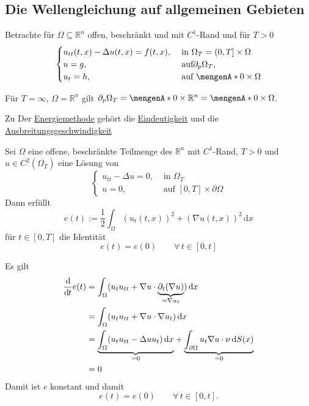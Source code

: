 \subsection{Die Wellengleichung auf allgemeinen Gebieten} 
\label{sub:die_wellengleichung_auf_allgemeinen_gebieten}
Betrachte für $\Omega \subseteq \mathbb{R}^n$ offen, beschränkt und mit $C^1$-Rand und für $T >0$
\[
	\begin{cases}
		u_{tt}(t,x) - \Delta u(t,x) = f(t,x), &\text{ in }\Omega_T = (0,T] \times \Omega\\
		u=g ,&\text{ auf} \partial_p \Omega_T, \\
		u_t=h, &\text{ auf } \set{0} \times \Omega		
	\end{cases}
\]
\begin{bemerkung}
	Für $T= \infty$, $ \Omega = \mathbb{R}^n$ gilt $ \partial _p \Omega_T = \set{0} \times \mathbb{R}^n = \set{0} \times \Omega$.
\end{bemerkung}
Zu Der \underline{Energiemethode} gehört die \underline{Eindeutigkeit} und die \underline{Ausbreitungsgeschwindigkeit} 

\begin{lemma}
	Sei $\Omega$ eine offene, beschränkte Teilmenge des $\mathbb{R}^n$ mit $C^1$-Rand, $T>0$ und $u \in C^2(\overline{\Omega_T})$ eine Lösung von
	\[
		\begin{cases}
			u_{tt}- \Delta u = 0, &\text{ in }\Omega_T\\
			u=0, &\text{ auf }[0,T] \times \partial \Omega
		\end{cases}
	\]
	Dann erfüllt 
	\[
		e(t) := \frac{1}{2} \int_{\Omega}^{} (u_t(t,x))^2 + ( \nabla u(t,x))^2 \,\mathrm{d}x
	\]
	für $t \in [0,T]$ die Identität
	\[
		e(t) = e(0) \qquad \forall\, t \in [0,t]
	\]
\end{lemma}
\begin{beweis}
	Es gilt
	\begin{align*}
		\frac{\mathrm{d}\mkern-1.0mu }{\mathrm{d}\mkern-1.0mu t} e(t) &= \int_{\Omega}^{}( u_t u_{tt} +  \nabla u \cdot \underset{=  \nabla u_t}{\underbrace{\partial_t (  \nabla u)}}) \,\mathrm{d}x \\
		&= \int_{\Omega}^{}( u_t u_{tt} +  \nabla u \cdot  \nabla u_t) \,\mathrm{d}x \\ 
		&= \underset{=0}{\underbrace{\int_{\Omega}^{} (u_t u_{tt} - \Delta u u_t) \,\mathrm{d}x}} 
		+ \underset{=0}{\underbrace{ \int_{ \partial \Omega}^{} u_t  \nabla u \cdot \nu \,\mathrm{d}S(x)}} \\
		&=0
	\end{align*}
	Damit ist $e$ konstant und damit
	\[
		e(t) = e(0) \qquad \forall\, t \in [0,t].
	\]
\end{beweis}
